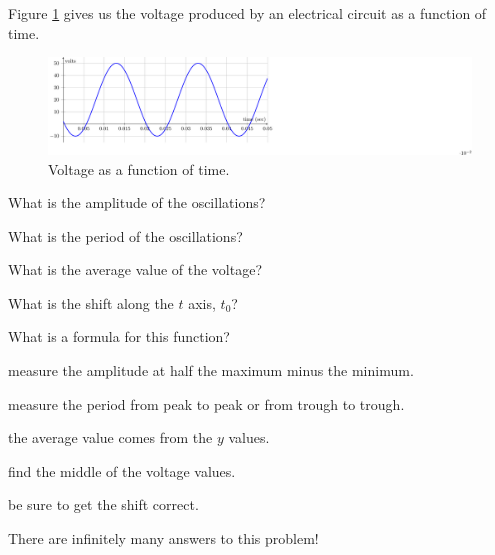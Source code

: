 \begin{activity}\label{A:0.5.2}
    Figure \ref{fig:0.5.A1} gives us the voltage produced by an electrical circuit as a function of time.
    \begin{figure}[ht!]
    \begin{center}
        \includegraphics[trim=0cm 0cm 12cm 0cm, clip, width=0.9\columnwidth]{figures/0-5-fig9.pdf}
    \end{center}
    \caption{Voltage as a function of time.}
    \label{fig:0.5.A1}
\end{figure}


\ba
\item What is the amplitude of the oscillations?  %
\item What is the period of the oscillations? %
\item What is the average value of the voltage?  %
\item What is the shift along the $t$ axis, $t_0$?  %
\item What is a formula for this function?  %
\ea

\end{activity}
\begin{smallhint}
    \ba
        \item measure the amplitude at half the maximum minus the minimum.
        \item measure the period from peak to peak or from trough to trough.
        \item the average value comes from the $y$ values.
        \item find the middle of the voltage values.
        \item be sure to get the shift correct.  
        \item There are infinitely many answers to this
            problem!
    \ea
\end{smallhint}
